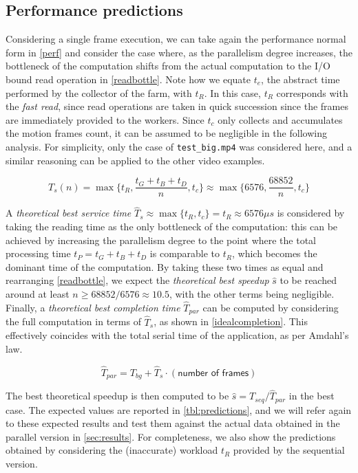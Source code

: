 \documentclass{article}
\begin{document}
\subsection{Performance predictions}

Considering a single frame execution, we can take again the performance normal form in \autoref{perf} and consider the case where, as the parallelism degree increases, the bottleneck of the computation shifts from the actual computation to the I/O bound read operation in \autoref{readbottle}. Note how we equate $t_e$, the abstract time performed by the collector of the farm, with $t_R$. In this case, $t_R$ corresponds with the \emph{fast read}, since read operations are taken in quick succession since the frames are immediately provided to the workers. Since $t_c$ only collects and accumulates the motion frames count, it can be assumed to be negligible in the following analysis. For simplicity, only the case of \texttt{test\_big.mp4} was considered here, and a similar reasoning can be applied to the other video examples. 

\begin{equation}\label{readbottle}
T_s(n) = \max\{t_R,\frac{t_G + t_B + t_D}{n},t_c\} \approx \max\{6576,\frac{68852}{n},t_c\}
\end{equation}

A \emph{theoretical best service time} $\widehat T_s \approx \max\{t_R, t_c\} = t_R \approx 6576 \mu s$ is considered by taking the reading time as the only bottleneck of the computation: this can be achieved by increasing the parallelism degree to the point where the total processing time \mbox{$t_P=t_G+t_B+t_D$} is comparable to $t_R$, which becomes the dominant time of the computation. By taking these two times as equal and rearranging \autoref{readbottle}, we expect the \emph{theoretical best speedup} $\widehat{s}$ to be reached around at least $n \geq 68852/6576 \approx 10.5$, with the other terms being negligible. Finally, a \emph{theoretical best completion time} $\widehat T_{par}$ can be computed by considering the full computation in terms of $\widehat T_s$, as shown in \autoref{idealcompletion}. This effectively coincides with the total serial time of the application, as per Amdahl's law.

\begin{equation}\label{idealcompletion}
\widehat T_{par} = T_{bg} + \widehat T_s \cdot (\textsf{number of frames})
\end{equation}

The best theoretical speedup is then computed to be $\widehat{s} = T_{seq} / \widehat T_{par}$ in the best case. The expected values are reported in \autoref{tbl:predictions}, and we will refer again to these expected results and test them against the actual data obtained in the parallel version in \autoref{sec:results}. For completeness, we also show the predictions obtained by considering the (inaccurate) workload $t_R$ provided by the sequential version.
\end{document}
